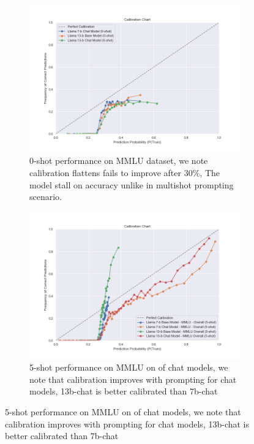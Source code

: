 \documentclass[11pt]{article}
\begin{document}
\begin{figure}
     \centering
     \begin{subfigure}[b]{0.49\textwidth}
         \centering \includegraphics[width=1.3\textwidth]{figures/0-shot-13-b-chat-vs-13-b-hf}
         \caption{0-shot performance on MMLU dataset, we note calibration flattens fails to improve after 30\%, The model stall on accuracy unlike in multishot prompting scenario.}
         \label{fig:0-shot-MMLU}
     \end{subfigure}
     \hfill
     \begin{subfigure}[b]{0.49\textwidth}
         \centering
         \includegraphics[width=1.3\textwidth]{figures/5-shot-MMLU.png}
         \caption{5-shot performance on MMLU on of chat models, we note that calibration improves with prompting for chat models, 13b-chat is better calibrated than 7b-chat}
         \label{fig:5-shot-logicqa}
     \end{subfigure}     
     

\end{figure}
\end{document}
